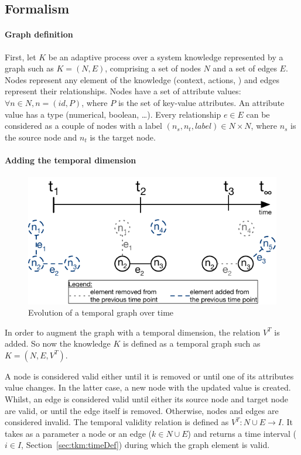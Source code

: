 \subsection{Formalism}
\label{sec:tkm:k-formalism:formalism}
 
\paragraph{Graph definition}
First, let $K$ be an adaptive process over a system \gls{knowledge} represented by a graph such as $K = (N, E)$, comprising a set of nodes $N$ and a set of edges $E$.
Nodes represent any element of the knowledge (context, actions, \etc) and edges represent their relationships.
Nodes have a set of attribute values: $\forall n \in N, n = (id, P)$, where $P$ is the set of key-value attributes.
An attribute value has a type (numerical, boolean, \ldots). 
Every relationship $e \in E$ can be considered as a couple of nodes with a label $(n_s, n_t, label) \in N \times N$, where $n_s$ is the source node and $n_t$ is the target node.

\paragraph{Adding the temporal dimension}

\begin{figure}
   \centering
	\includegraphics{img/chapt-tkm/formalism/validityExample}
	\caption{Evolution of a temporal graph over time}
	\label{fig:tkm:validityEx}
\end{figure}

In order to augment the graph with a temporal dimension, the relation $V^T$ is added.
So now the knowledge $K$ is defined as a temporal graph such as $K = (N, E, V^T)$.

A node is considered valid either until it is removed or until one of its attributes value changes. 
In the latter case, a new node with the updated value is created.
Whilst, an edge is considered valid until either its source node and target node are valid, or until the edge itself is removed.
Otherwise, nodes and edges are considered invalid.
The temporal validity relation is defined as $V^T: N \cup E \rightarrow I$.
It takes as a parameter a node or an edge ($k \in N \cup E$) and returns a time interval ($i \in I$, \cf Section~\ref{sec:tkm:timeDef}) during which the graph element is valid.

